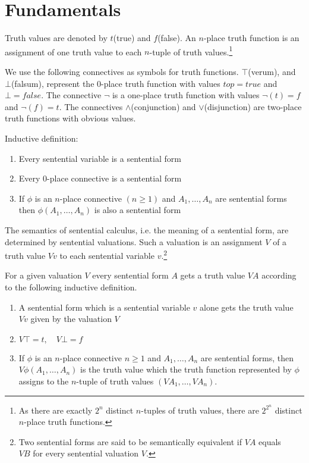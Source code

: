 \documentclass[nobib,notoc]{tufte-handout}
\begin{document}
\section{Fundamentals}
\begin{defi}
	Truth values are denoted by \(t\)(true) and \(f\)(false). An \(n\)-place truth function is an assignment of one truth value to each \(n\)-tuple of truth values.\footnote{As there are exactly \(2^n\) distinct \(n\)-tuples of truth values, there are \(2^{2^n}\) distinct \(n\)-place truth functions.}
\end{defi}
We use the following connectives as symbols for truth functions. \(\top\)(verum), and \(\bot\)(falsum), represent the \(0\)-place truth function with values \(top=true\) and \(\bot=false\). The connective \(\neg\) is a one-place truth function with values \(\neg(t)=f\) and \(\neg(f)=t\). The connectives \(\wedge\)(conjunction) and \(\vee\)(disjunction) are two-place truth functions with obvious values.
\begin{defi}
Inductive definition:
	\begin{enumerate}
		\item Every sentential variable is a sentential form
		\item Every \(0\)-place connective is a sentential form
		\item If \(\phi\) is an \(n\)-place connective \((n\geq1)\) and \(A_1, \dots, A_n\) are sentential forms then \(\phi(A_1,\dots,A_n)\) is also a sentential form
	\end{enumerate}
\end{defi}
The semantics of sentential calculus, i.e. the meaning of a sentential form, are determined by sentential valuations. Such a valuation is an assignment \(V\) of a truth value \(Vv\) to each sentential variable \(v\).\footnote{Two sentential forms are said to be semantically equivalent if \(VA\) equals \\\(VB\) for every sentential valuation \(V\).}
\begin{defi}[Valuation]
	For a given valuation \(V\) every sentential form \(A\) gets a truth value \(VA\) according to the following inductive definition.
	\begin{enumerate}
	\item A sentential form which is a sentential variable \(v\) alone gets the truth value \(Vv\) given by the valuation \(V\)
	\item \(V\top=t,\quad V\bot=f\)
	\item If \(\phi\) is an \(n\)-place connective \(n\geq 1\)  and \(A_1,\ldots,A_n\) are sentential forms, then \(V\phi(A_1,\ldots,A_n)\) is the truth value which the truth function represented by \(\phi\) assigns to the \(n\)-tuple of truth values \((VA_1,\ldots,VA_n)\).
	\end{enumerate}
\end{defi}
\end{document}
